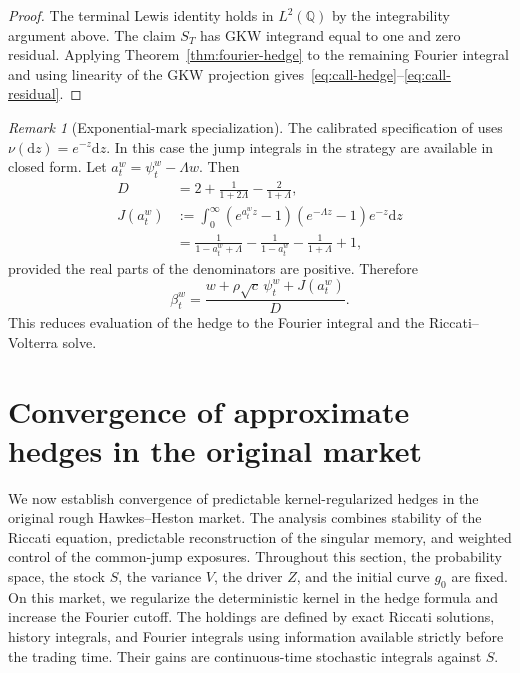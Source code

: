 \documentclass[11pt]{article}
\theoremstyle{definition}
\theoremstyle{remark}
\newtheorem{remark}[theorem]{Remark}
\newcommand{\Q}{\mathbb{Q}}
\newcommand{\1}{\mathbf{1}}
\newcommand{\dd}{\mathrm{d}}
\begin{document}
\begin{proof}
The terminal Lewis identity holds in $L^2(\Q)$ by the integrability argument
above. The claim $S_T$ has GKW integrand equal to one and zero residual.
Applying Theorem~\ref{thm:fourier-hedge} to the remaining Fourier integral and
using linearity of the GKW projection
gives~\eqref{eq:call-hedge}--\eqref{eq:call-residual}.
\end{proof}

\begin{remark}[Exponential-mark specialization]
The calibrated specification of \citet{bondi2024} uses
$\nu(\dd z)=e^{-z}\dd z$. In this case the jump integrals in the strategy are
available in closed form. Let $a_t^w=\psi_t^w-\Lambda w$. Then
\begin{align}
 D
 &=2+\frac{1}{1+2\Lambda}-\frac{2}{1+\Lambda},
 \label{eq:D-exp-marks}\\
 J(a_t^w)
 &:=\int_0^\infty(e^{a_t^wz}-1)(e^{-\Lambda z}-1)e^{-z}\dd z
 \nonumber\\
 &=\frac{1}{1-a_t^w+\Lambda}
   -\frac{1}{1-a_t^w}
   -\frac{1}{1+\Lambda}+1,
 \label{eq:J-exp-marks}
\end{align}
provided the real parts of the denominators are positive. Therefore
\begin{equation}
\label{eq:beta-exp-marks}
 \beta_t^w=\frac{w+\rho\sqrt c\,\psi_t^w+J(a_t^w)}{D}.
\end{equation}
This reduces evaluation of the hedge to the Fourier integral and the
Riccati--Volterra solve.
\end{remark}


\section{Convergence of approximate hedges in the original market}
\label{sec:original-market-stability}

We now establish convergence of predictable kernel-regularized hedges in the
original rough Hawkes--Heston market. The analysis combines stability of
the Riccati equation, predictable reconstruction of the singular memory,
and weighted control of the common-jump exposures. Throughout this section,
the probability space, the stock $S$, the variance $V$, the driver $Z$, and
the initial curve $g_0$ are fixed. On this market, we regularize the
deterministic kernel in the hedge formula and increase the Fourier cutoff.
The holdings are defined by exact Riccati solutions, history integrals, and
Fourier integrals using information available strictly before the trading
time. Their gains are continuous-time stochastic integrals against $S$.
\end{document}
